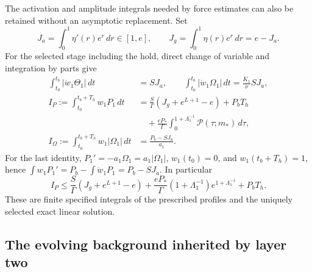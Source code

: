 The activation and amplitude integrals needed by force estimates can
also be retained without an asymptotic replacement. Set
\[
 J_a=\int_0^1\eta'(r)e^r\,dr\in[1,e],\qquad
 J_g=\int_0^1\eta(r)e^r\,dr=e-J_a.
\]
For the selected stage including the hold, direct change of variable
and integration by parts give
\begin{align}
 \int_{t_0}^{t_b}|\dot w_1\Theta_1|\,dt&=S J_a,\qquad
 \int_{t_0}^{t_b}|\dot w_1\Omega_1|\,dt=\frac{K_1}{\nu}S J_a,
 \label{cvlane:eq:cv-first-activation-cost}\\
 I_P:=\int_{t_0}^{t_b+T_h}w_1P_1\,dt
 &=\frac S\Gamma(J_g+e^{L+1}-e)+P_bT_h\nonumber\\
 &\quad+\frac{eP_*}{\Gamma}\int_0^{1+\Lambda_1^{-1}}
                    \mathcal P(\tau;m_*)\,d\tau,
 \label{cvlane:eq:cv-first-P-cost}\\
 I_\Omega:=\int_{t_0}^{t_b+T_h}w_1|\Omega_1|\,dt
 &=\frac{P_b-SJ_a}{a_1}.
 \label{cvlane:eq:cv-first-Omega-cost}
\end{align}
For the last identity, $P_1'=-a_1\Omega_1=a_1|\Omega_1|$,
$w_1(t_0)=0$, and $w_1(t_b+T_h)=1$, hence
$\int w_1P_1'=P_b-\int\dot w_1P_1=P_b-SJ_a$.
In particular
\[
 I_P\leq\frac S\Gamma(J_g+e^{L+1}-e)
 +\frac{eP_*}{\Gamma}(1+\Lambda_1^{-1})e^{1+\Lambda_1^{-1}}
 +P_bT_h.
\]
These are finite specified integrals of the prescribed profiles and
the uniquely selected exact linear solution.

\subsection{The evolving background inherited by layer two}

